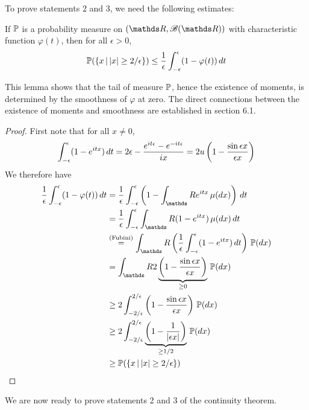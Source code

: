 \begin{unexaminable}
To prove statements 2 and 3, we need the following estimates:
\begin{lemma}
If $\mathbb{P}$ is a probability measure on $(\R,\B(\R))$ with characteristic function $\varphi(t)$, then for all $\epsilon > 0$, 
\begin{equation} \label{eq:cf_tail_bound}
    \mathbb{P}(\left\{ x \,|\, |x| \geq 2/\epsilon \right \}) \leq \frac{1}{\epsilon} \int_{-\epsilon}^\epsilon (1-\varphi(t)) \, dt
\end{equation}
\end{lemma}

This lemma shows that the tail of measure $\mathbb{P}$, hence the existence of moments, is determined by the smoothness of $\varphi$ at zero. The direct connections between the existence of moments and smoothness are established in section 6.1.

\begin{proof}
First note that for all $x \neq 0$,
\begin{equation}
\int_{-\epsilon}^\epsilon (1-e^{itx}) \, dt = 2\epsilon - \frac{e^{it\epsilon} - e^{-it\epsilon}}{ix} = 2u\left( 1-\frac{\sin \epsilon x}{\epsilon x} \right)
\end{equation}
We therefore have
\begin{align*}
    \frac{1}{\epsilon} \int_{-\epsilon}^\epsilon (1-\varphi(t)) \, dt 
    &= \frac{1}{\epsilon} \int_{-\epsilon}^\epsilon \bracket{1 - \int_\R e^{itx} \, \mu(dx)} \, dt \\
    &= \frac{1}{\epsilon} \int_{-\epsilon}^\epsilon \int_\R (1-e^{itx}) \, \mu(dx) \, dt \\
    &\overset{\text{(Fubini)}}{=} \int_\R \bracket{\frac{1}{\epsilon} \int_{-\epsilon}^\epsilon (1-e^{itx}) \, dt} \, \p(dx) \\
    &= \int_\R 2 \underbrace{\bracket{1 - \frac{\sin \epsilon x}{\epsilon x}}}_{\geq 0} \, \p(dx) \\ 
    &\geq 2 \int_{-2/\epsilon}^{2/\epsilon} \bracket{1 - \frac{\sin \epsilon x}{\epsilon x}} \, \p(dx) \\
    &\geq 2 \int_{-2/\epsilon}^{2/\epsilon} \underbrace{\bracket{1 - \frac{1}{|\epsilon x|}}}_{\geq 1/2} \, \p(dx) \\
    &\geq \p(\set{x \,|\, |x| \geq 2/\epsilon})
\end{align*}
\end{proof}

We are now ready to prove statements 2 and 3 of the continuity theorem.


\end{unexaminable}
